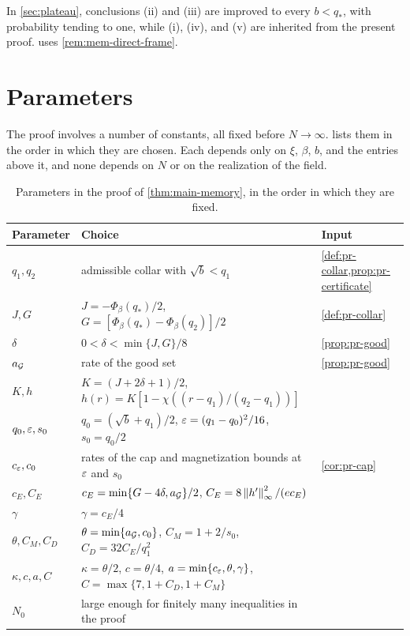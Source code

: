 In \cref{sec:plateau}, conclusions (ii) and (iii) are improved to every $b<q_*$, with probability tending to one, while (i), (iv), and (v) are inherited from the present proof.  uses \cref{rem:mem-direct-frame}.

\section{Parameters}\label{sec:mem-parameters}

The proof involves a number of constants, all fixed before $N\to\infty$.  lists them in the order in which they are chosen. Each depends only on $\xi$, $\beta$, $b$, and the entries above it, and none depends on $N$ or on the realization of the field.

\begin{table}[ht]
\centering
\small
\caption{Parameters in the proof of \cref{thm:main-memory}, in the order in which they are fixed.}\label{tab:mem-parameters}
\begin{tabular}{@{}>{\raggedright}p{2.2cm}>{\raggedright}p{9.6cm}>{\raggedright\arraybackslash}p{3.6cm}@{}}
\toprule
Parameter & Choice & Input\\
\midrule
$q_1,q_2$ & admissible collar with $\sqrt b<q_1$ & \cref{def:pr-collar,prop:pr-certificate}\\
$J,G$ & $J=-\Phi_\beta(q_*)/2$, $G=[\Phi_\beta(q_*)-\Phi_\beta(q_2)]/2$ & \cref{def:pr-collar}\\
$\delta$ & $0<\delta<\min\{J,G\}/8$ & \cref{prop:pr-good}\\
$a_\mathcal G$ & rate of the good set & \cref{prop:pr-good}\\
$K,h$ & $K=(J+2\delta+1)/2$, $h(r)=K[1-\chi((r-q_1)/(q_2-q_1))]$ & \\
$q_0,\varepsilon,s_0$ & $q_0=(\sqrt b+q_1)/2$, $\varepsilon=(q_1-q_0)^2/16$, $s_0=q_0/2$ & \\
$c_\varepsilon,c_0$ & rates of the cap and magnetization bounds at $\varepsilon$ and $s_0$ & \cref{cor:pr-cap}\\
$c_E,C_E$ & $c_E=\min\{G-4\delta,a_\mathcal G\}/2$, $C_E=8\left\lVert h'\right\rVert_\infty^2/(ec_E)$ & \\
$\gamma$ & $\gamma=c_E/4$ & \\
$\theta,C_M,C_D$ & $\theta=\min\{a_\mathcal G,c_0\}$, $C_M=1+2/s_0$, $C_D=32C_E/q_1^2$ & \\
$\kappa,c,a,C$ & $\kappa=\theta/2$, $c=\theta/4$, $a=\min\{c_\varepsilon,\theta,\gamma\}$, $C=\max\{7,1+C_D,1+C_M\}$ & \\
$N_0$ & large enough for finitely many inequalities in the proof & \\
\bottomrule
\end{tabular}
\end{table}

